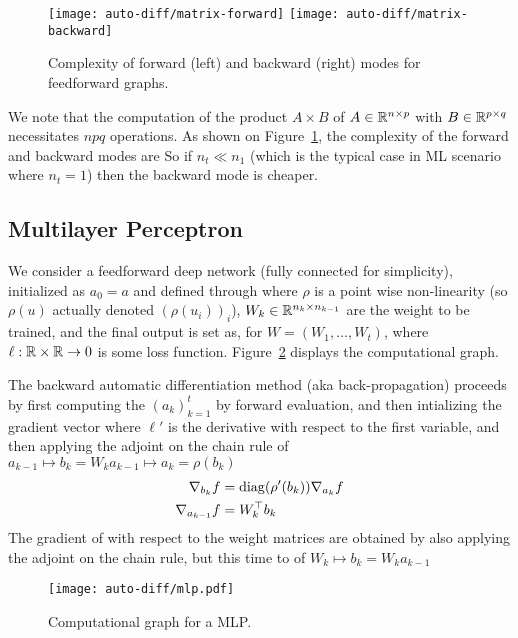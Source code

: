 \begin{figure}
\centering
\texttt{[image: auto-diff/matrix-forward]} 
\quad\quad
\texttt{[image: auto-diff/matrix-backward]} 
\caption{\label{fig-matrix-mult}
Complexity of forward (left) and backward (right) modes for feedforward graphs.
}
\end{figure}

We note that the computation of the product $A \times B$ of $A \in \mathbb{R}^{n \times p}$ with $B \in \mathbb{R}^{p \times q}$ necessitates $npq$ operations.
%
As shown on Figure~\ref{fig-matrix-mult}, the complexity of the forward and backward modes are
So if $n_t \ll n_1$ (which is the typical case in ML scenario where $n_t=1$) then the backward mode is cheaper. 




\subsection{Multilayer Perceptron}
\label{sec-autodiff-mlp}


We consider a feedforward deep network (fully connected for simplicity), initialized as $a_0=a$ and defined through 
where $\rho$ is a point wise non-linearity (so $\rho(u)$ actually denoted $(\rho(u_i))_i$), $W_k \in \mathbb{R}^{n_k \times n_{k-1}}$ are the weight to be trained, and the final output is set as, for $W=(W_1,\ldots,W_t)$, 
where $\ell : \mathbb{R} \times \mathbb{R} \rightarrow 0$ is some loss function. Figure~\ref{fig-mlp} displays the computational graph.

The backward automatic differentiation method (aka back-propagation) proceeds by first computing the $(a_k)_{k=1}^t$ by forward evaluation, and then intializing the gradient vector
where $\ell'$ is the derivative with respect to the first variable, and then applying the adjoint on the chain rule of $a_{k-1} \mapsto b_k  = W_k a_{k-1}\mapsto a_k = \rho(b_k)$
\begin{align*}
	\nabla_{b_{k}} f &= \operatorname{diag}(\rho'(b_k)) \nabla_{a_k} f \\
	\nabla_{a_{k-1}} f &= W_k^\top b_{k}
\end{align*}
The gradient of with respect to the weight matrices are obtained by also applying the adjoint on the chain rule, but this time to of $W_k \mapsto b_k  = W_k a_{k-1}$


\begin{figure}
\centering
\texttt{[image: auto-diff/mlp.pdf]} 
\caption{\label{fig-mlp}
Computational graph for a MLP.
}
\end{figure}


